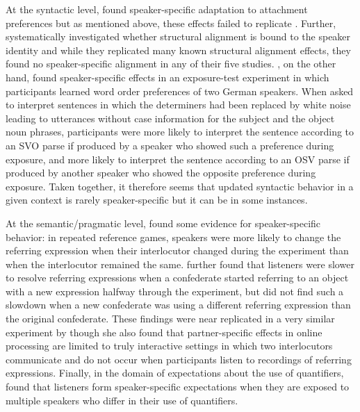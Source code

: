 At the syntactic level, \textcite{Kamide2012} found speaker-specific adaptation to attachment preferences but as mentioned above, these effects failed to replicate \cite{Liu2017}. Further, 
\textcite{Ostrand2019} systematically investigated whether structural alignment is bound to the speaker identity and while they replicated many known structural 
alignment effects, they found no speaker-specific alignment in any of their five studies. \textcite{Kroczek2017}, on the other hand, found speaker-specific effects in an exposure-test experiment in which
participants learned word order preferences of two German speakers. When asked to interpret sentences in which the determiners had been replaced by white noise leading to utterances
without case information for the subject and the object noun phrases, participants were more likely to interpret the sentence according to an SVO parse if produced by a speaker who showed such a preference
during exposure, and more likely to interpret the sentence according to an OSV parse if produced by another speaker who showed the opposite preference during exposure. Taken together, it therefore seems that updated syntactic behavior in a given context is rarely speaker-specific but it can be in some instances.

At the semantic/pragmatic level, \textcite{Brennan1996} found some evidence for speaker-specific behavior: in repeated reference games, speakers were more likely to 
change the referring expression when their interlocutor changed during the experiment than when the interlocutor remained the same. \textcite{Metzing2003} further
found that listeners were slower to resolve referring expressions when a confederate started referring to an object with a new expression halfway through the experiment, 
but did not find such a slowdown when a new confederate was using a different referring expression than the original confederate. These findings were near replicated 
in a very similar experiment by \textcite{BrownSchmidt2009} though she also found that partner-specific effects in online processing are limited to truly interactive settings in which
two interlocutors communicate and do not occur when participants listen to recordings of referring expressions. Finally, in the domain of expectations about the use of quantifiers,
\textcite{Yildirim2016} found that listeners form speaker-specific expectations when they are exposed to multiple speakers who differ in their use of quantifiers. 

